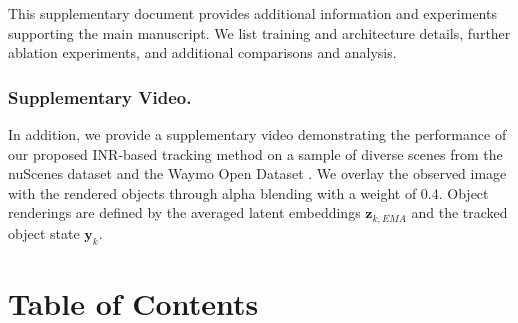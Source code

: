 \documentclass[runningheads]{llncs}
\renewcommand{\cftaftertoctitle}{\hfill\hfill}
\newcommand{\todo}[1]{{\color{red}#1}}
\begin{document}
This supplementary document provides additional information and experiments supporting the main manuscript. We list training and architecture details, further ablation experiments, and additional comparisons and analysis.

\subsubsection{Supplementary Video.} In addition, we provide a supplementary video demonstrating the performance of our proposed INR-based tracking method on a sample of diverse scenes from the nuScenes \cite{caesar2020nuscenes} dataset and the Waymo Open Dataset \cite{sun2020scalability}. We overlay the observed image with the rendered objects through alpha blending with a weight of 0.4. Object renderings are defined by the averaged latent embeddings $\textbf{z}_{k,EMA}$ and the tracked object state $\textbf{y}_k$.


\section*{Table of Contents}
\begin{adjustbox}{minipage=\textwidth, trim=0pt -5pt 0pt 112pt, clip}
\begingroup
\setcounter{tocdepth}{2}
\let\clearpage\relax %
\tableofcontents
\endgroup
\end{adjustbox}






% 
% 




%
%
\clearpage


\end{document}
